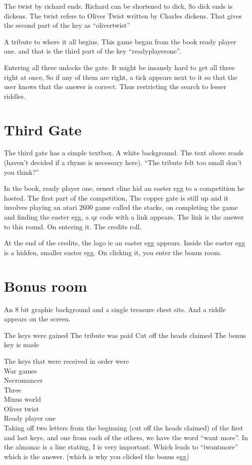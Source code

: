 \documentclass[12pt]{article}
\begin{document}
The twist by richard ends. Richard can be shortened to dick, So dick ends is dickens. The twist refers to Oliver Twist written by Charles dickens. That gives the second part of the key as ``olivertwist''

A tribute to where it all begins. This game began from the book ready player one. and that is the third part of the key ``readyplayerone''.

Entering all three unlocks the gate. It might be insanely hard to get all three right at once, So if any of them are right, a tick appears next to it so that the user knows that the answer is correct. Thus restricting the search to lesser riddles.

\section{Third Gate}
The third gate has a simple textbox. A white background. The text above reads (haven't decided if a rhyme is necessary here). ``The tribute felt too small don't you think?''

In the book, ready player one, ernest cline hid an easter egg to a competition he hosted. The first part of the competition, The copper gate is still up and it involves playing an atari 2600 game called the stacks, on completing the game and finding the easter egg, a qr code with a link appears. The link is the answer to this round. On entering it. The credits roll.

At the end of the credits, the logo ie an easter egg appears. Inside the easter egg is a hidden, smaller easter egg. On clicking it, you enter the bonus room.

\section{Bonus room}
An 8 bit graphic background and a single treasure chest sits. And a riddle appears on the screen.

\begin{centering}
The keys were gained
The tribute was paid
Cut off the heads claimed
The bonus key is made
\end{centering}

The keys that were received in order were\\
War games\\
Necromancer\\
Three\\
Minus world\\
Oliver twist\\
Ready player one\\

Taking off two letters from the beginning (cut off the heads claimed) of the first and last keys, and one from each of the others, we have the word ``want more''. In the almanac is a line stating, I is very important. Which leads to ``iwantmore'' which is the answer. (which is why you clicked the bonus egg)
\end{document}
